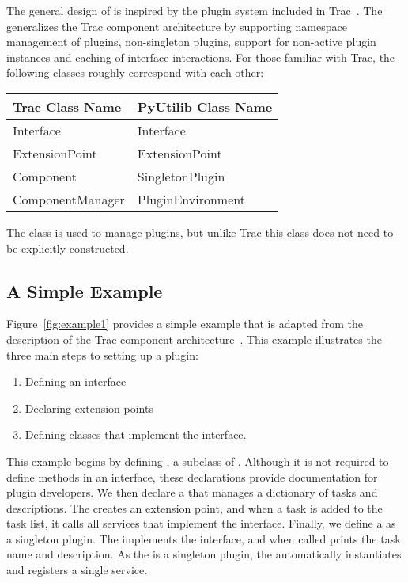The general design of \pcasp is inspired by the plugin system
included in Trac~\cite{Trac}. The \pcasp generalizes the Trac
component architecture by supporting namespace management of plugins,
non-singleton plugins, support for non-active plugin instances and
caching of interface interactions. For those familiar with Trac,
the following classes roughly correspond with each other:
\begin{center}
\begin{tabular}{|l|l|} \hline
    Trac Class Name &   PyUtilib Class Name \\ \hline
    Interface   & Interface \\
    ExtensionPoint  & ExtensionPoint \\
    Component   & SingletonPlugin \\
    ComponentManager    & PluginEnvironment \\ \hline
\end{tabular}
\end{center}
The  class is used to manage plugins, but unlike Trac this class does not   need to be explicitly constructed.


\subsection{A Simple Example}

Figure~\ref{fig:example1} provides a simple example that is adapted from
the description of the Trac component architecture~\cite{TCA}. This
example illustrates the three main steps to setting up a plugin: 
\begin{enumerate}
\item Defining an interface
\item Declaring extension points
\item Defining classes that implement the interface. 
\end{enumerate}
This example begins by defining , a subclass of . 
Although it is not required to define methods in an interface, these
declarations provide documentation for plugin developers.
We then declare a  that manages a
dictionary of tasks and descriptions.  The  creates an
 extension point, and when a task is added to the
task list, it calls all services that implement the 
interface.  Finally, we define a  as a singleton
plugin.  The  implements the 
interface, and when called prints the task name and description.  As the
 is a singleton plugin, the \pcasp automatically
instantiates and registers a single  service.

